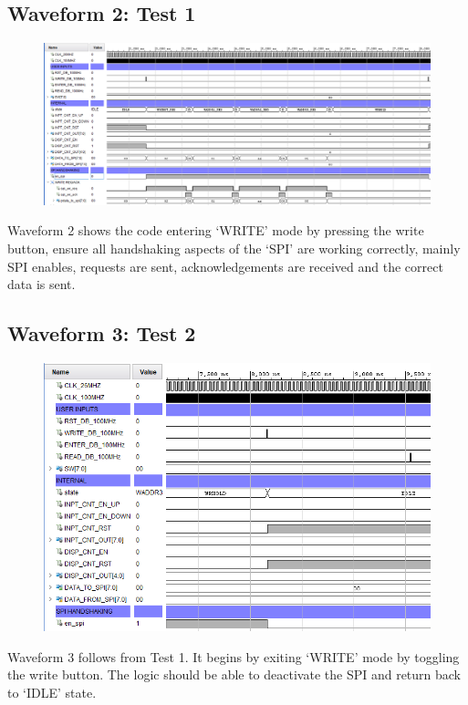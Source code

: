\documentclass[11pt]{report}
\begin{document}
\subsection*{Waveform 2: Test 1}
\begin{figure}[H]
    \includegraphics[width=\columnwidth]{Reports/Proj/Task3/Assets/Test1.PNG}
\end{figure}

Waveform 2 shows the code entering `WRITE' mode by pressing the write button, ensure all handshaking aspects of the `SPI' are working correctly, mainly SPI enables, requests are sent, acknowledgements are received and the correct data is sent.

\subsection*{Waveform 3: Test 2}
\begin{figure}[H]
    \includegraphics[width=\columnwidth]{Reports/Proj/Task3/Assets/Test2.PNG}
\end{figure}

Waveform 3 follows from Test 1. It begins by exiting `WRITE' mode by toggling the write button. The logic should be able to deactivate the SPI and return back to `IDLE' state.
\end{document}
